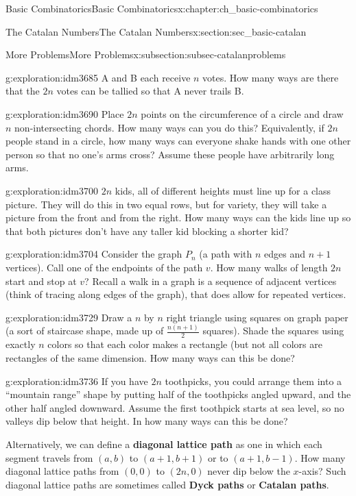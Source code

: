 \documentclass[oneside,10pt,]{book}
\newcommand{\terminology}[1]{\textbf{#1}}
\numberwithin{equation}{chapter}
\begin{document}
\begin{chapterptx}{Basic Combinatorics}{}{Basic Combinatorics}{}{}{x:chapter:ch_basic-combinatorics}
\begin{sectionptx}{The Catalan Numbers}{}{The Catalan Numbers}{}{}{x:section:sec_basic-catalan}
\begin{subsectionptx}{More Problems}{}{More Problems}{}{}{x:subsection:subsec-catalanproblems}
\begin{exploration}{}{g:exploration:idm3685}
A and B each receive \(n\) votes. How many ways are there that the \(2n\) votes can be tallied so that A never trails B.%
\end{exploration}
\begin{exploration}{}{g:exploration:idm3690}%
Place \(2n\) points on the circumference of a circle and draw \(n\)  non-intersecting chords.  How many ways can you do this?  Equivalently, if \(2n\) people stand in a circle, how many ways can everyone shake hands with one other person so that no one's arms cross?  Assume these people have arbitrarily long arms.%
\end{exploration}
\begin{exploration}{}{g:exploration:idm3700}%
\(2n\) kids, all of different heights must line up for a class picture.  They will do this in two equal rows, but for variety, they will take a picture from the front and from the right.  How many ways can the kids line up so that both pictures don't have any taller kid blocking a shorter kid?%
\end{exploration}
\begin{exploration}{}{g:exploration:idm3704}%
Consider the graph \(P_n\) (a path with \(n\) edges and \(n+1\) vertices).  Call one of the endpoints of the path \(v\).  How many walks of length \(2n\) start and stop at \(v\)?  Recall a walk in a graph is a sequence of adjacent vertices (think of tracing along edges of the graph), that does allow for repeated vertices.%
\end{exploration}
\begin{exploration}{}{g:exploration:idm3729}%
Draw a \(n\) by \(n\) right triangle using squares on graph paper (a sort of staircase shape, made up of \(\frac{n(n+1)}{2}\) squares).  Shade the squares using exactly \(n\) colors so that each color makes a rectangle (but not all colors are rectangles of the same dimension.  How many ways can this be done?%
\end{exploration}
\begin{exploration}{}{g:exploration:idm3736}%
If you have \(2n\) toothpicks, you could arrange them into a ``mountain range'' shape by putting half of the toothpicks angled upward, and the other half angled downward.  Assume the first toothpick starts at sea level, so no valleys dip below that height. In how many ways can this be done?%
\par
Alternatively, we can define a \terminology{diagonal lattice path} as one in which each segment travels from \((a,b)\) to \((a+1, b+1)\) or to \((a+1, b-1)\).  How many diagonal lattice paths from \((0,0)\) to \((2n,0)\) never dip below the \(x\)-axis?  Such diagonal lattice paths are sometimes called \terminology{Dyck paths} or \terminology{Catalan paths}.%

\end{exploration}
\end{subsectionptx}
\end{sectionptx}
\end{chapterptx}
\end{document}
